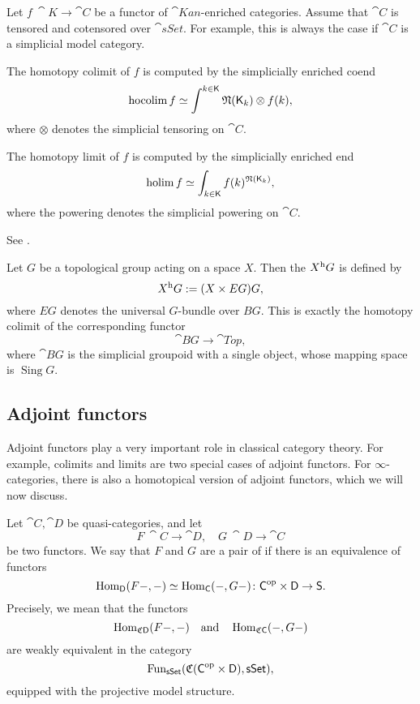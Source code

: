 \begin{proposition}
    Let $f\:\cat K\to\cat C$ be a functor of $\cat{Kan}$-enriched categories.
    Assume that $\cat C$ is tensored and cotensored over $\cat{sSet}$.
    For example, this is always the case if $\cat C$ is a simplicial model category.
    
    \begin{itms}
        \item The homotopy colimit of $f$
        is computed by the simplicially enriched coend 
        \[ \operatorname{hocolim}f\simeq\int^{k\in\textup{\textsf{K}}}\mathfrak{N}(\textup{\textsf{K}}_{k\/})\otimes f(k), \]
        where $\otimes$ denotes the simplicial tensoring on $\cat C$.
        \item The homotopy limit of $f$ is computed by the simplicially enriched end
        \[ \operatorname{holim}f\simeq\int_{k\in\textup{\textsf{K}}}f(k)^{\mathfrak{N}(\textup{\textsf{K}}_{\/k})}, \]
        where the powering denotes the simplicial powering on $\cat C$.
    \end{itms}
\end{proposition}

See \cite{riehl}.

\begin{example}
    Let $G$ be a topological group acting on a space $X$.
    Then the  $X\/{}^{\mathrm h}G$ is defined by 
    \[ X\/{}^{\mathrm h}G:=(X\times EG)\/G, \]
    where $EG$ denotes the universal $G$-bundle over $BG$.
    This is exactly the homotopy colimit of the corresponding functor 
    \[ \cat{B}G\to\cat{Top}, \]
    where $\cat BG$ is the simplicial groupoid with a single object,
    whose mapping space is $\operatorname{Sing}G$. \varqed
\end{example}

\subsection{Adjoint functors}

Adjoint functors play a very important role
in classical category theory.
For example, colimits and limits are two special cases of adjoint functors.
For $\infty$-categories,
there is also a homotopical version of adjoint functors,
which we will now discuss.

\begin{definition}
    Let $\cat C,\cat D$ be quasi-categories, and let 
    \[ F\:\cat C\to\cat D,\quad G\:\cat D\to\cat C \]    
    be two functors. We say that $F$ and $G$ are a pair of 
     if there is an equivalence of functors 
    \[ \operatorname{Hom}_{\textup{\textsf{D}}}(F-,-)\simeq\operatorname{Hom}_{\textup{\textsf{C}}}(-,G-)\colon\textup{\textsf{C}}^{\mathrm{op}}\times\textup{\textsf{D}}\to\textup{\textsf{S}}. \]
    Precisely, we mean that the functors
    \[ \operatorname{Hom}_{\mathfrak C\textup{\textsf{D}}}(F-,-)\quad\text{and}\quad\operatorname{Hom}_{\mathfrak C\textup{\textsf{C}}}(-,G-) \]
    are weakly equivalent in the category 
    \[ \operatorname{Fun}_{\textup{\textsf{sSet}}}(\mathfrak C(\textup{\textsf{C}}^{\mathrm{op}}\times\textup{\textsf{D}}),\textup{\textsf{sSet}}), \]
    equipped with the projective model structure.
\end{definition}

